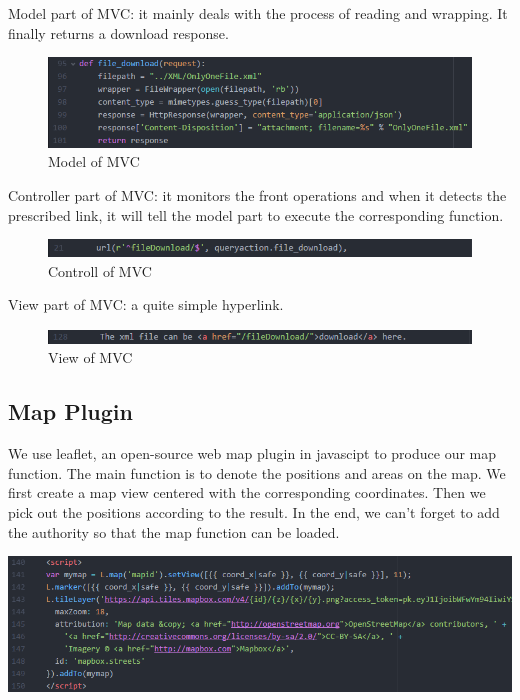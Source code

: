 \documentclass[final,1p,times]{elsarticle}
\begin{document}
Model part of MVC: it mainly deals with the process of reading and wrapping. It finally returns a download response.
\begin{figure}[thpb]
      \centering
      \includegraphics[width=14cm]{Q6.png}
      \caption{Model of MVC}
      \label{fig:q6}
\end{figure}
Controller part of MVC: it monitors the front operations and when it detects the prescribed link, it will tell the model part to execute the corresponding function.
\begin{figure}[thpb]
      \centering
      \includegraphics[width=14cm]{Q7.png}
      \caption{Controll of MVC}
      \label{fig:q7}
\end{figure}
View part of MVC: a quite simple hyperlink.
\begin{figure}[thpb]
      \centering
      \includegraphics[width=14cm]{Q8.png}
      \caption{View of MVC}
      \label{fig:q8}
\end{figure}
\subsection{Map Plugin}
We use leaflet, an open-source web map plugin in javascipt to produce our map function. The main function is to denote the positions and areas on the map.
We first create a map view centered with the corresponding coordinates. Then we pick out the positions according to the result. In the end, we can’t forget to add the authority so that the map function can be loaded.
\begin{center}
      \includegraphics[width=14cm]{Q9.png}
\end{center}
\end{document}
